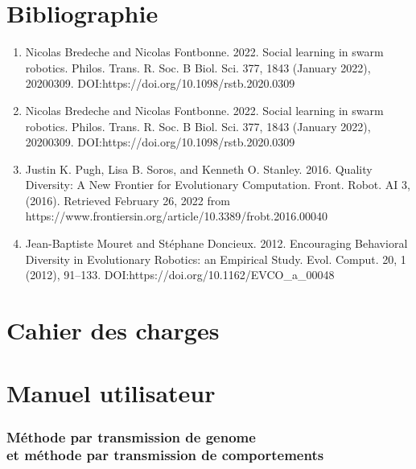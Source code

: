 \documentclass[a4paper, 12pt]{report}
\begin{document}
    \chapter{Bibliographie}
    \begin{enumerate}
	\item {Nicolas Bredeche and Nicolas Fontbonne. 2022. Social learning in swarm robotics. Philos. Trans. R. Soc. B Biol. Sci. 377, 1843 (January 2022), 20200309. DOI:https://doi.org/10.1098/rstb.2020.0309}
	\item{Nicolas Bredeche and Nicolas Fontbonne. 2022. Social learning in swarm robotics. Philos. Trans. R. Soc. B Biol. Sci. 377, 1843 (January 2022), 20200309. DOI:https://doi.org/10.1098/rstb.2020.0309
}
\item{Justin K. Pugh, Lisa B. Soros, and Kenneth O. Stanley. 2016. Quality Diversity: A New Frontier for Evolutionary Computation. Front. Robot. AI 3, (2016). Retrieved February 26, 2022 from https://www.frontiersin.org/article/10.3389/frobt.2016.00040}
\item{Jean-Baptiste Mouret and Stéphane Doncieux. 2012. Encouraging Behavioral Diversity in Evolutionary Robotics: an Empirical Study. Evol. Comput. 20, 1 (2012), 91–133. DOI:https://doi.org/10.1162/EVCO\_a\_00048}
    \end{enumerate}


    \chapter{Cahier des charges}
    \begin{figure}[H]
		
    \end{figure}
    \chapter{Manuel utilisateur}
    
    
    \subsection{Méthode par transmission de genome \\ et méthode par transmission de comportements}
    
\end{document}
